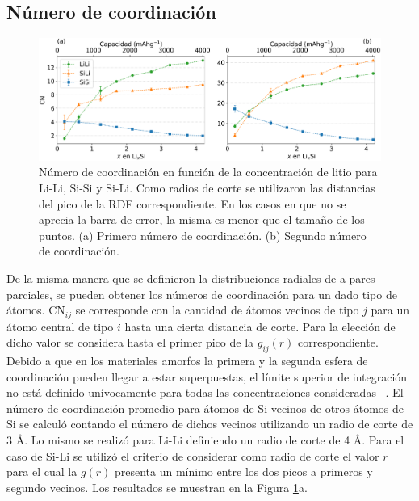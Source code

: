 \subsection{Número de coordinación}

\begin{figure}[h]
    \centering
    \includegraphics[width=\textwidth]{Silicio/caracterizacion/resultados/cn/cn.png}
    \caption{Número de coordinación en función de la concentración de litio para
    Li-Li, Si-Si y Si-Li. Como radios de corte se utilizaron las distancias 
    del pico de la RDF correspondiente. En los casos en que no se aprecia la barra
    de error, la misma es menor que el tamaño de los puntos. (a) Primero número 
    de coordinación. (b) Segundo número de coordinación.}
    \label{fig:cn}
\end{figure}

De la misma manera que se definieron la distribuciones radiales de a pares parciales,
se pueden obtener los números de coordinación para un dado tipo de átomos. CN$_{ij}$
se corresponde con la cantidad de átomos vecinos de tipo $j$ para un átomo central
de tipo $i$ hasta una cierta distancia de corte. Para la elección de dicho valor 
se considera hasta el primer pico de la $g_{ij}(r)$ correspondiente. Debido a que 
en los materiales amorfos la primera y la segunda esfera de coordinación pueden 
llegar a estar superpuestas, el límite superior de integración no está definido 
unívocamente para todas las concentraciones consideradas ~\cite{lamparter1995}.
El número de coordinación promedio para átomos de Si vecinos de otros átomos 
de Si se calculó contando el número de dichos vecinos utilizando un radio de 
corte de 3 \AA. Lo mismo se realizó para Li-Li definiendo un radio de corte de 
4 \AA. Para el caso de Si-Li se utilizó el criterio de considerar como radio de 
corte el valor $r$ para el cual la $g(r)$ presenta un mínimo entre los dos picos
a primeros y segundo vecinos. Los resultados se muestran en la Figura 
\ref{fig:cn}a.

